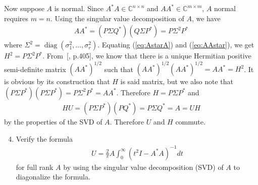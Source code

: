 \documentclass[10pt, A4paper]{article}
\newcommand{\mxm}{m \times m}
\DeclareMathOperator{\diag}{diag}
\begin{document}
Now suppose $A$ is normal. Since $A^*A \in \mathbb{C}^{n\times n}$ and
$AA^* \in \mathbb{C}^{\mxm}$, $A$ normal requires $m=n$.
Using the singular value decomposition of $A$, we have
\begin{align}
	AA^* = (P\Sigma Q^*) (Q\Sigma P^*) = P\Sigma^2 P^*
	\label{eq:AAstar}
\end{align}
where $\Sigma^2 = \diag(\sigma_1^2, \ldots,\sigma_r^2)$.
Equating (\ref{eq:AstarA}) and (\ref{eq:AAstar}), we get 
$H^2 = P\Sigma^2P^*$. From~[\citealp{hojo1985}, p.405], we know 
that there
is a unique Hermitian positive semi-definite matrix $(AA^*)^{1/2}$ such 
that $(AA^*)^{1/2}(AA^*)^{1/2} = AA^* = H^2$.
It is obvious by its construction that $H$ is said matrix, but we also
note that $(P\Sigma P^*) (P\Sigma P^*) = P \Sigma^2P^* = AA^*$.
Therefore $H = P\Sigma P^*$ and
\begin{align}
	HU = (P\Sigma P^*) (PQ^*) = P \Sigma Q^* = A = UH
\end{align}
by the properties of the SVD of $A$. Therefore $U$ and $H$ commute.
 
 
 
 

\vspace{0.2cm}
\begin{enumerate}
	\setcounter{enumi}{3}
	\item Verify the formula
	\begin{align*}
		U = \frac{2}{\pi}A \int_{0}^{\infty} (t^2I - A^*A)^{-1}dt
		\tag{*}
		\label{eq:Q4}
	\end{align*}
	for full rank $A$ by using the singular value decomposition (SVD)
	of $A$ to diagonalize the formula.
\end{enumerate}
\end{document}
